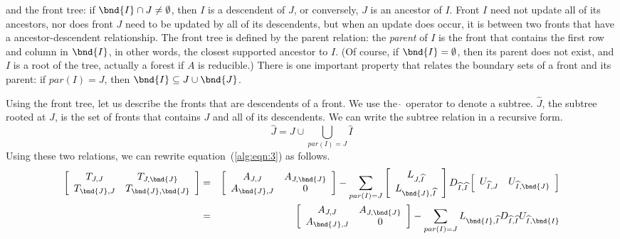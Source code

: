 and the front tree: if $\bnd{I} \cap J \ne \emptyset$, then $I$ is
a descendent of $J$, or conversely, $J$ is an ancestor of $I$.
Front $I$ need not update all of its ancestors, nor does front $J$
need to be updated by all of its descendents, but when an update
does occur, it is between two fronts that have a
ancestor-descendent relationship.
The front tree is defined by the parent relation:
the {\it parent} of $I$ is the front that contains the first row
and column in $\bnd{I}$, in other words, the closest supported
ancestor to $I$.
(Of course, if $\bnd{I} = \emptyset$, then its parent does not
exist, and $I$ is a root of the tree, actually a forest if $A$ is
reducible.)
There is one important property that relates the boundary sets of a
front and its parent: 
if $par(I) = J$, then $\bnd{I} \subseteq J \cup \bnd{J}$.
\par
Using the front tree, let us describe the fronts that are
descendents of a front.
We use the ${\widehat {\ }}$ operator to denote a subtree.
${\widehat J}$, the subtree rooted at $J$,
is the set of fronts that contains $J$ and all of its descendents.
We can write the subtree relation in a recursive form.
$$
{\widehat J} = J \cup \bigcup_{par(I) = J} {\widehat I}
$$
Using these two relations, we can rewrite
equation~(\ref{alg:eqn:3}) as follows.
\begin{eqnarray}
\label{alg:eqn:4}
\left \lbrack \begin{array}{cc}
T_{J,J} & T_{J, \bnd{J}} \\
T_{\bnd{J},J} & T_{\bnd{J},\bnd{J}}
\end{array} \right \rbrack
& = &
\left \lbrack \begin{array}{cc}
A_{J,J} & A_{J, \bnd{J}} \\
A_{\bnd{J},J} & 0
\end{array} \right \rbrack
-
\sum_{par(I) = J}
\left \lbrack \begin{array}{c}
L_{J,{\widehat I}} \nonumber \\
L_{\bnd{J},{\widehat I}}
\end{array} \right \rbrack
D_{{\widehat I},{\widehat I}} 
\left \lbrack \begin{array}{cc}
U_{{\widehat I},J} & U_{{\widehat I},\bnd{J}}
\end{array} \right \rbrack \\
& = & 
\left \lbrack \begin{array}{cc}
A_{J,J} & A_{J, \bnd{J}} \\
A_{\bnd{J},J} & 0
\end{array} \right \rbrack
- 
\sum_{par(I) = J}
L_{\bnd{I}, {\widehat I}}
D_{{\widehat I}, {\widehat I}}
U_{{\widehat I}, \bnd{I}}
\end{eqnarray}
